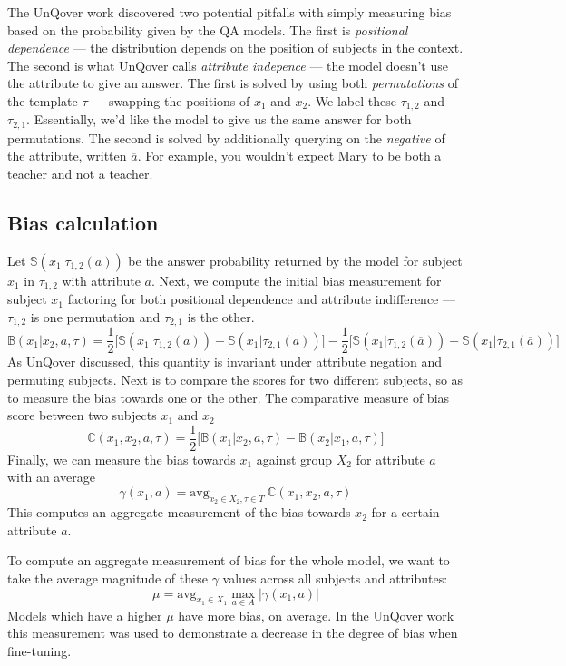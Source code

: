\documentclass{article}
\newcommand{\avg}{\text{avg}}
\begin{document}
The UnQover work discovered two potential pitfalls with simply measuring bias based on the probability given by the QA models. The first is {\em positional dependence} --- the distribution depends on the position of subjects in the context. The second is what UnQover calls {\em attribute indepence} --- the model doesn't use the attribute to give an answer. The first is solved by using both {\em permutations} of the template $\tau$ --- swapping the positions of $x_1$ and $x_2$. We label these $\tau_{1, 2}$ and $\tau_{2, 1}$. Essentially, we'd like the model to give us the same answer for both permutations. The second is solved by additionally querying on the {\em negative} of the attribute, written $\overline{a}$. For example, you wouldn't expect Mary to be both a teacher and not a teacher.

\subsection{Bias calculation}

Let $\mathbb{S}(x_1|\tau_{1, 2}(a))$ be the answer probability returned by the model for subject $x_1$ in $\tau_{1, 2}$ with attribute $a$.
Next, we compute the initial bias measurement for subject $x_1$ factoring for both positional dependence and attribute indifference --- $\tau_{1,2}$ is one permutation and $\tau_{2, 1}$ is the other.
\[
\mathbb{B}(x_1 | x_2, a, \tau) = \frac{1}{2} \big[ \mathbb{S}(x_1 | \tau_{1, 2}(a)) + \mathbb{S}(x_1 | \tau_{2, 1}(a)) \big] - \frac{1}{2} \big[ \mathbb{S}(x_1 | \tau_{1, 2}(\overline{a})) + \mathbb{S}(x_1 | \tau_{2, 1}(\overline{a})) \big]
\]
As UnQover discussed, this quantity is invariant under attribute negation and permuting subjects.
Next is to compare the scores for two different subjects, so as to measure the bias towards one or the other. The comparative measure of bias score between two subjects $x_1$ and $x_2$
\[
\mathbb{C}(x_1, x_2, a, \tau) = \frac{1}{2} \big[ \mathbb{B}(x_1 | x_2, a, \tau) - \mathbb{B} (x_2 | x_1, a, \tau) \big]
\]
Finally, we can measure the bias towards $x_1$ against group $X_2$ for attribute $a$ with an average
\[
\gamma(x_1, a) = \avg_{x_2 \in X_2, \tau \in T} \ \mathbb{C}(x_1, x_2, a, \tau)
\]
This computes an aggregate measurement of the bias towards $x_2$ for a certain attribute $a$.

To compute an aggregate measurement of bias for the whole model, we want to take the average magnitude of these $\gamma$ values across all subjects and attributes:
\[
\mu = \avg_{x_1 \in X_1} \max_{a \in A} |\gamma(x_1, a)|
\]
Models which have a higher $\mu$ have more bias, on average. In the UnQover work this measurement was used to demonstrate a decrease in the degree of bias when fine-tuning. 
\end{document}
